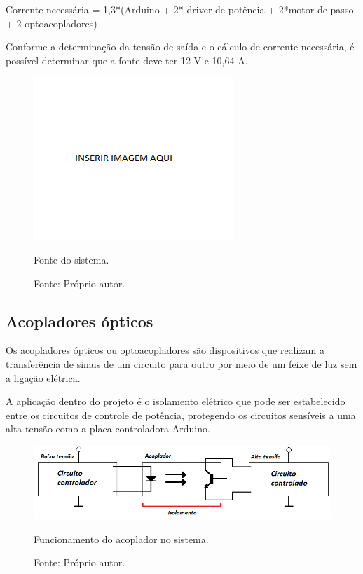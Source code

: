 Corrente necessária = 1,3*(Arduino + 2* driver de potência + 2*motor de passo + 2 optoacopladores)

Conforme a determinação da tensão de saída e o cálculo de corrente necessária, 
é possível determinar que a fonte deve ter 12 V e 10,64 A.

\begin{figure}[!htb]
\centering
\includegraphics[scale = 0.2]{figuras/3-17}
\caption{Fonte do sistema.}
\caption*{Fonte: Próprio autor.}
\label{figfonte}
\end{figure}
    
\subsection{Acopladores ópticos}

Os acopladores ópticos ou optoacopladores são dispositivos que realizam a transferência de 
sinais de um circuito para outro por meio de um feixe de luz sem a ligação elétrica.

A aplicação dentro do projeto é o isolamento elétrico que pode ser estabelecido entre 
os circuitos de controle de potência, protegendo os circuitos sensíveis a uma alta tensão 
como a placa controladora Arduino.

\begin{figure}[!htb]
\centering
\includegraphics[scale = 0.7]{figuras/3-18}
\caption{Funcionamento do acoplador no sistema.}
\caption*{Fonte: Próprio autor.}
\label{figacoplador}
\end{figure}
    
